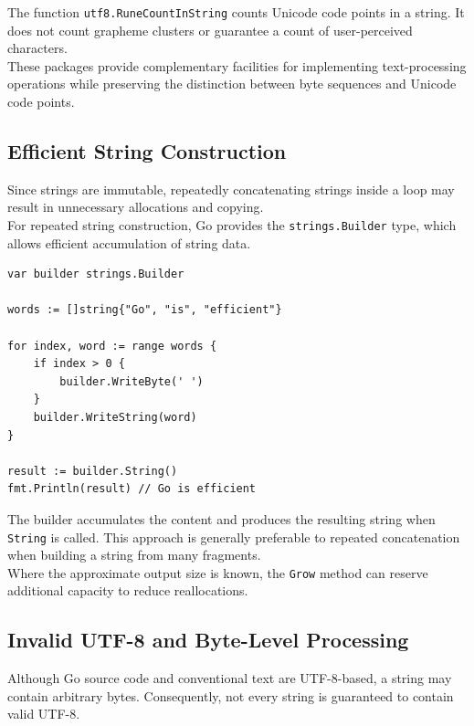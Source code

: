 The function \texttt{utf8.RuneCountInString} counts Unicode code points in a string. It does not count grapheme clusters or guarantee a count of user-perceived characters.\\

These packages provide complementary facilities for implementing text-processing operations while preserving the distinction between byte sequences and Unicode code points.

\subsection{Efficient String Construction}

Since strings are immutable, repeatedly concatenating strings inside a loop may result in unnecessary allocations and copying.\\

For repeated string construction, Go provides the \texttt{strings.Builder} type, which allows efficient accumulation of string data.

\begin{lstlisting}
var builder strings.Builder

words := []string{"Go", "is", "efficient"}

for index, word := range words {
    if index > 0 {
        builder.WriteByte(' ')
    }
    builder.WriteString(word)
}

result := builder.String()
fmt.Println(result) // Go is efficient
\end{lstlisting}

The builder accumulates the content and produces the resulting string when \texttt{String} is called. This approach is generally preferable to repeated concatenation when building a string from many fragments.\\

Where the approximate output size is known, the \texttt{Grow} method can reserve additional capacity to reduce reallocations.

\subsection{Invalid UTF-8 and Byte-Level Processing}

Although Go source code and conventional text are UTF-8-based, a string may contain arbitrary bytes. Consequently, not every string is guaranteed to contain valid UTF-8.\\

